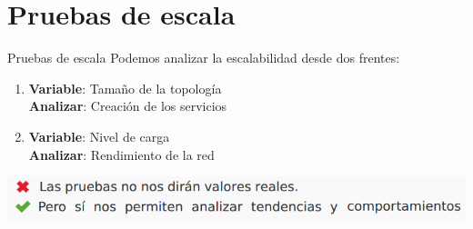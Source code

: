 \documentclass[xcolor=svgnames]{beamer}
\begin{document}
\section{Pruebas de escala}

\begin{frame}{}
	\tableofcontents[currentsection]
\end{frame}

\begin{frame}{Pruebas de escala}
	Podemos analizar la escalabilidad desde dos frentes:
	\begin{enumerate}
		\item \textbf{Variable}: Tamaño de la topología \\
		\textbf{Analizar}: Creación de los servicios
		\item \textbf{Variable}: Nivel de carga \\
		\textbf{Analizar}: Rendimiento de la red
	\end{enumerate}
	\includegraphics[scale=0.6]{resultados_pruebas_no}
\end{frame}
\end{document}
